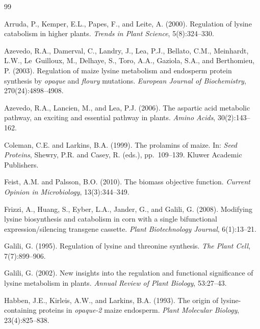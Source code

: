\documentclass[12pt,a4paper]{article}
\begin{document}
\begin{thebibliography}{99}

Arruda, P., Kemper, E.L., Papes, F., and Leite, A. (2000).
\newblock Regulation of lysine catabolism in higher plants.
\newblock \textit{Trends in Plant Science}, 5(8):324--330.

Azevedo, R.A., Damerval, C., Landry, J., Lea, P.J., Bellato, C.M., Meinhardt, L.W., Le~Guilloux, M., Delhaye, S., Toro, A.A., Gaziola, S.A., and Berthomieu, P. (2003).
\newblock Regulation of maize lysine metabolism and endosperm protein synthesis by \textit{opaque} and \textit{floury} mutations.
\newblock \textit{European Journal of Biochemistry}, 270(24):4898--4908.

Azevedo, R.A., Lancien, M., and Lea, P.J. (2006).
\newblock The aspartic acid metabolic pathway, an exciting and essential pathway in plants.
\newblock \textit{Amino Acids}, 30(2):143--162.

Coleman, C.E. and Larkins, B.A. (1999).
\newblock The prolamins of maize.
\newblock In: \textit{Seed Proteins}, Shewry, P.R. and Casey, R. (eds.), pp.\ 109--139. Kluwer Academic Publishers.

Feist, A.M. and Palsson, B.O. (2010).
\newblock The biomass objective function.
\newblock \textit{Current Opinion in Microbiology}, 13(3):344--349.

Frizzi, A., Huang, S., Eyber, L.A., Jander, G., and Galili, G. (2008).
\newblock Modifying lysine biosynthesis and catabolism in corn with a single bifunctional expression/silencing transgene cassette.
\newblock \textit{Plant Biotechnology Journal}, 6(1):13--21.

Galili, G. (1995).
\newblock Regulation of lysine and threonine synthesis.
\newblock \textit{The Plant Cell}, 7(7):899--906.

Galili, G. (2002).
\newblock New insights into the regulation and functional significance of lysine metabolism in plants.
\newblock \textit{Annual Review of Plant Biology}, 53:27--43.

Habben, J.E., Kirleis, A.W., and Larkins, B.A. (1993).
\newblock The origin of lysine-containing proteins in \textit{opaque-2} maize endosperm.
\newblock \textit{Plant Molecular Biology}, 23(4):825--838.


\end{thebibliography}
\end{document}
